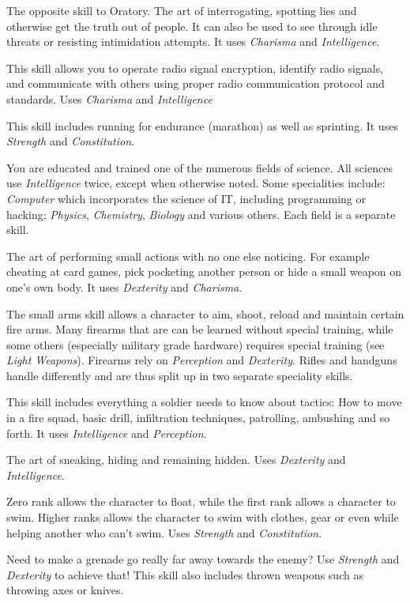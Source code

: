 \begin{description}
   The opposite skill to Oratory. The art of interrogating,
  spotting lies and otherwise get the truth out of people. It can also be used
  to see through idle threats or resisting intimidation attempts. It uses
  \emph{Charisma} and \emph{Intelligence}.

   This skill allows you to operate radio signal
  encryption, identify radio signals, and communicate with others using proper
  radio communication protocol and standards. Uses \emph{Charisma} and
  \emph{Intelligence}

   This skill includes running for endurance (marathon) as well as
  sprinting. It uses \emph{Strength} and \emph{Constitution}.

   You are educated and trained one of the
  numerous fields of science. All sciences use \emph{Intelligence} twice, except
  when otherwise noted. Some specialities include: \emph{Computer} which
  incorporates the science of IT, including programming or hacking;
  \emph{Physics}, \emph{Chemistry}, \emph{Biology} and various others. Each
  field is a separate skill.

   The art of performing small actions with no one else
  noticing. For example cheating at card games, pick pocketing another person
  or hide a small weapon on one's own body. It uses \emph{Dexterity} and
  \emph{Charisma}.

   The small arms skill allows a character to aim, shoot,
  reload and maintain certain fire arms. Many firearms that are can be learned
  without special training, while some others (especially military grade
  hardware) requires special training (see \emph{Light Weapons}). Firearms rely
  on \emph{Perception} and \emph{Dexterity}. Rifles and handguns handle
  differently and are thus split up in two separate speciality skills.

   This skill includes everything a soldier needs to
  know about tactics: How to move in a fire squad, basic drill, infiltration
  techniques, patrolling, ambushing and so forth. It uses \emph{Intelligence} and
  \emph{Perception}.

   The art of sneaking, hiding and remaining hidden. Uses
  \emph{Dexterity} and \emph{Intelligence}.

   Zero rank allows the character to float, while the first rank
  allows a character to swim. Higher ranks allows the character to swim with
  clothes, gear or even while helping another who can't swim. Uses \emph{Strength}
  and \emph{Constitution}.

   Need to make a grenade go really far away towards the enemy?
  Use \emph{Strength} and \emph{Dexterity} to achieve that! This skill also
  includes thrown weapons such as throwing axes or knives.
\end{description}
